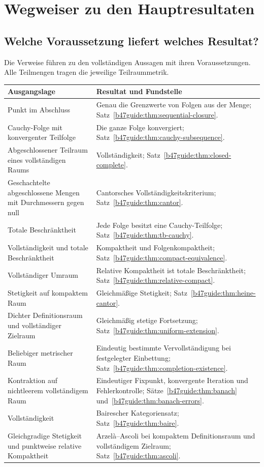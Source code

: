 \chapter{Wegweiser zu den Hauptresultaten}
\label{b47guide:ch:roadmap}

\section{Welche Voraussetzung liefert welches Resultat?}

Die Verweise führen zu den vollständigen Aussagen mit ihren Voraussetzungen.
Alle Teilmengen tragen die jeweilige Teilraummetrik.

\begin{center}
\small
\begin{tabularx}{\linewidth}{@{}p{.30\linewidth}X@{}}
\toprule
Ausgangslage & Resultat und Fundstelle\\
\midrule
Punkt im Abschluss & Genau die Grenzwerte von Folgen aus der Menge;
Satz~\ref{b47guide:thm:sequential-closure}.\\[4pt]
Cauchy-Folge mit konvergenter Teilfolge & Die ganze Folge konvergiert;
Satz~\ref{b47guide:thm:cauchy-subsequence}.\\[4pt]
Abgeschlossener Teilraum eines vollständigen Raums & Vollständigkeit;
Satz~\ref{b47guide:thm:closed-complete}.\\[4pt]
Geschachtelte abgeschlossene Mengen mit Durchmessern gegen null &
Cantorsches Vollständigkeitskriterium;
Satz~\ref{b47guide:thm:cantor}.\\[4pt]
Totale Beschränktheit & Jede Folge besitzt eine Cauchy-Teilfolge;
Satz~\ref{b47guide:thm:tb-cauchy}.\\[4pt]
Vollständigkeit und totale Beschränktheit & Kompaktheit und
Folgenkompaktheit; Satz~\ref{b47guide:thm:compact-equivalence}.\\[4pt]
Vollständiger Umraum & Relative Kompaktheit ist totale Beschränktheit;
Satz~\ref{b47guide:thm:relative-compact}.\\[4pt]
Stetigkeit auf kompaktem Raum & Gleichmäßige Stetigkeit;
Satz~\ref{b47guide:thm:heine-cantor}.\\[4pt]
Dichter Definitionsraum und vollständiger Zielraum &
Gleichmäßig stetige Fortsetzung;
Satz~\ref{b47guide:thm:uniform-extension}.\\[4pt]
Beliebiger metrischer Raum & Eindeutig bestimmte Vervollständigung
bei festgelegter Einbettung;
Satz~\ref{b47guide:thm:completion-existence}.\\[4pt]
Kontraktion auf nichtleerem vollständigem Raum & Eindeutiger Fixpunkt,
konvergente Iteration und Fehlerkontrolle;
Sätze~\ref{b47guide:thm:banach} und~\ref{b47guide:thm:banach-errors}.\\[4pt]
Vollständigkeit & Bairescher Kategoriensatz;
Satz~\ref{b47guide:thm:baire}.\\[4pt]
Gleichgradige Stetigkeit und punktweise relative Kompaktheit &
Arzelà--Ascoli bei kompaktem Definitionsraum und vollständigem Zielraum;
Satz~\ref{b47guide:thm:ascoli}.\\
\bottomrule
\end{tabularx}
\end{center}

